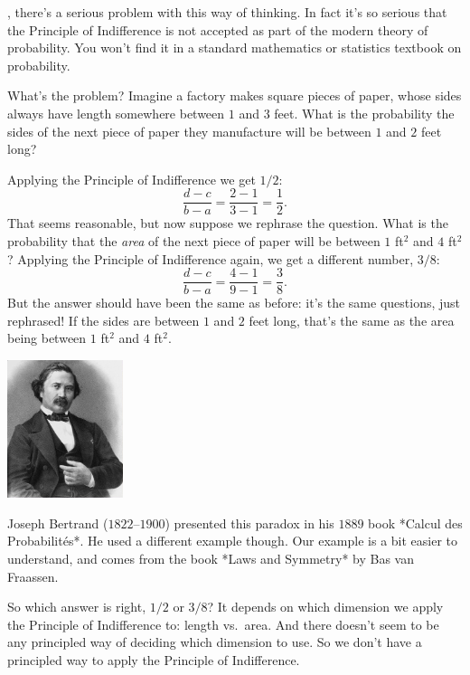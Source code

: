 \documentclass[justified]{tufte-book}
\theoremstyle{definition}
\theoremstyle{definition}
\theoremstyle{definition}
\theoremstyle{remark}
\begin{document}
, there's a serious problem with this way of
thinking. In fact it's so serious that the Principle of Indifference is
not accepted as part of the modern theory of probability. You won't find
it in a standard mathematics or statistics textbook on probability.

What's the problem? Imagine a factory makes square pieces of paper,
whose sides always have length somewhere between \(1\) and \(3\) feet.
What is the probability the sides of the next piece of paper they
manufacture will be between \(1\) and \(2\) feet long?

Applying the Principle of Indifference we get \(1/2\):
\[ \frac{d-c}{b-a} = \frac{2-1}{3-1} = \frac{1}{2}. \] That seems
reasonable, but now suppose we rephrase the question. What is the
probability that the \emph{area} of the next piece of paper will be
between \(1\) ft\(^2\) and \(4\) ft\(^2\)? Applying the Principle of
Indifference again, we get a different number, \(3/8\):
\[ \frac{d-c}{b-a} = \frac{4-1}{9-1} = \frac{3}{8}. \] But the answer
should have been the same as before: it's the same questions, just
rephrased! If the sides are between \(1\) and \(2\) feet long, that's
the same as the area being between \(1\) ft\(^2\) and \(4\) ft\(^2\).

\begin{marginfigure}
\includegraphics[width=1.33in]{img/bertrand} \caption[Joseph Bertrand ($1822$--$1900$) presented this paradox in his $1889$ book *Calcul des Probabilités*]{Joseph Bertrand ($1822$--$1900$) presented this paradox in his $1889$ book *Calcul des Probabilités*. He used a different example though. Our example is a bit easier to understand, and comes from the book *Laws and Symmetry* by Bas van Fraassen.}\label{fig:unnamed-chunk-135}
\end{marginfigure}

So which answer is right, \(1/2\) or \(3/8\)? It depends on which
dimension we apply the Principle of Indifference to: length vs.~area.
And there doesn't seem to be any principled way of deciding which
dimension to use. So we don't have a principled way to apply the
Principle of Indifference.
\end{document}
